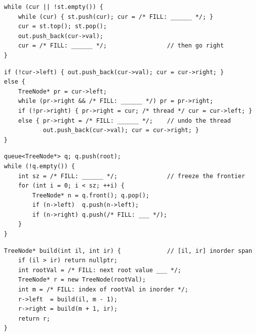 \begin{lstlisting}[caption={Drill 2 -- explicit-stack inorder (from \coderef{c03-inorder-stack})}]
while (cur || !st.empty()) {
    while (cur) { st.push(cur); cur = /* FILL: ______ */; }
    cur = st.top(); st.pop();
    out.push_back(cur->val);
    cur = /* FILL: ______ */;                 // then go right
}
\end{lstlisting}

\begin{lstlisting}[caption={Drill 3 -- Morris inorder (from \coderef{c03-morris})}]
if (!cur->left) { out.push_back(cur->val); cur = cur->right; }
else {
    TreeNode* pr = cur->left;
    while (pr->right && /* FILL: ______ */) pr = pr->right;
    if (!pr->right) { pr->right = cur; /* thread */ cur = cur->left; }
    else { pr->right = /* FILL: ______ */;    // undo the thread
           out.push_back(cur->val); cur = cur->right; }
}
\end{lstlisting}

\begin{lstlisting}[caption={Drill 4 -- one BFS row (from \coderef{c03-bfs})}]
queue<TreeNode*> q; q.push(root);
while (!q.empty()) {
    int sz = /* FILL: ______ */;              // freeze the frontier
    for (int i = 0; i < sz; ++i) {
        TreeNode* n = q.front(); q.pop();
        if (n->left)  q.push(n->left);
        if (n->right) q.push(/* FILL: ___ */);
    }
}
\end{lstlisting}

\begin{lstlisting}[caption={Drill 5 -- rebuild from inorder + a root (from \coderef{c03-build})}]
TreeNode* build(int il, int ir) {             // [il, ir] inorder span
    if (il > ir) return nullptr;
    int rootVal = /* FILL: next root value ___ */;
    TreeNode* r = new TreeNode(rootVal);
    int m = /* FILL: index of rootVal in inorder */;
    r->left  = build(il, m - 1);
    r->right = build(m + 1, ir);
    return r;
}
\end{lstlisting}

